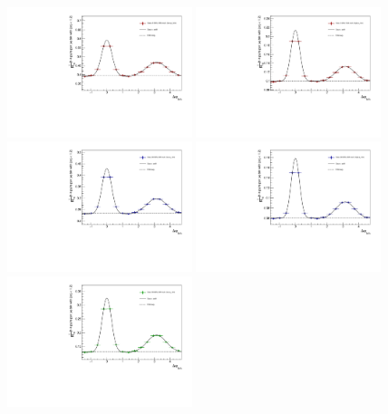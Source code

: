 \begin{figure}[ht]
    \centering
    \includegraphics[width=0.48\textwidth]{figures/analysis/h_h_dphi_gaus_0_20_lowpt.pdf}
    \includegraphics[width=0.48\textwidth]{figures/analysis/h_h_dphi_gaus_0_20_highpt.pdf}
    \includegraphics[width=0.48\textwidth]{figures/analysis/h_h_dphi_gaus_20_50_lowpt.pdf}
    \includegraphics[width=0.48\textwidth]{figures/analysis/h_h_dphi_gaus_20_50_highpt.pdf}
    \includegraphics[width=0.48\textwidth]{figures/analysis/h_h_dphi_gaus_50_80_lowpt.pdf}

\end{figure}
